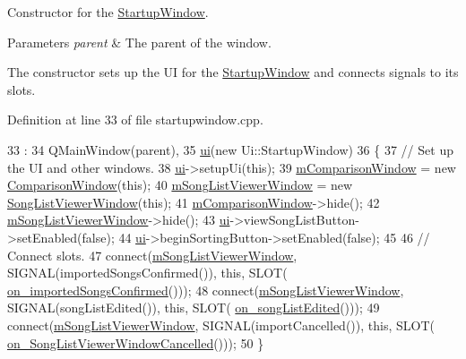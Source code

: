 Constructor for the \mbox{\hyperlink{class_startup_window}{Startup\+Window}}. 


\begin{DoxyParams}{Parameters}
{\em parent} & The parent of the window.\\
\hline
\end{DoxyParams}
The constructor sets up the UI for the \mbox{\hyperlink{class_startup_window}{Startup\+Window}} and connects signals to its slots. 

Definition at line 33 of file startupwindow.\+cpp.


\begin{DoxyCode}
33                                             :
34     QMainWindow(parent),
35     \mbox{\hyperlink{class_startup_window_a5afeeaabe9a34a02a67d2e7d9f36dc09}{ui}}(\textcolor{keyword}{new} Ui::StartupWindow)
36 \{
37     \textcolor{comment}{// Set up the UI and other windows.}
38     \mbox{\hyperlink{class_startup_window_a5afeeaabe9a34a02a67d2e7d9f36dc09}{ui}}->setupUi(\textcolor{keyword}{this});
39     \mbox{\hyperlink{class_startup_window_a674395b4edbe76568be4f0f4c7577ac1}{mComparisonWindow}} = \textcolor{keyword}{new} \mbox{\hyperlink{class_comparison_window}{ComparisonWindow}}(\textcolor{keyword}{this});
40     \mbox{\hyperlink{class_startup_window_a26e72433e3cf3d35ae49d77d91f5cc38}{mSongListViewerWindow}} = \textcolor{keyword}{new} \mbox{\hyperlink{class_song_list_viewer_window}{SongListViewerWindow}}(\textcolor{keyword}{this});
41     \mbox{\hyperlink{class_startup_window_a674395b4edbe76568be4f0f4c7577ac1}{mComparisonWindow}}->hide();
42     \mbox{\hyperlink{class_startup_window_a26e72433e3cf3d35ae49d77d91f5cc38}{mSongListViewerWindow}}->hide();
43     \mbox{\hyperlink{class_startup_window_a5afeeaabe9a34a02a67d2e7d9f36dc09}{ui}}->viewSongListButton->setEnabled(\textcolor{keyword}{false});
44     \mbox{\hyperlink{class_startup_window_a5afeeaabe9a34a02a67d2e7d9f36dc09}{ui}}->beginSortingButton->setEnabled(\textcolor{keyword}{false});
45 
46     \textcolor{comment}{// Connect slots.}
47     connect(\mbox{\hyperlink{class_startup_window_a26e72433e3cf3d35ae49d77d91f5cc38}{mSongListViewerWindow}}, SIGNAL(importedSongsConfirmed()), \textcolor{keyword}{this}, SLOT(
      \mbox{\hyperlink{class_startup_window_ac4235050012186e44fbc4e3e3c990d81}{on\_importedSongsConfirmed}}()));
48     connect(\mbox{\hyperlink{class_startup_window_a26e72433e3cf3d35ae49d77d91f5cc38}{mSongListViewerWindow}}, SIGNAL(songListEdited()), \textcolor{keyword}{this}, SLOT(
      \mbox{\hyperlink{class_startup_window_a18e7e279255ae11a1121f880d597dae9}{on\_songListEdited}}()));
49     connect(\mbox{\hyperlink{class_startup_window_a26e72433e3cf3d35ae49d77d91f5cc38}{mSongListViewerWindow}}, SIGNAL(importCancelled()), \textcolor{keyword}{this}, SLOT(
      \mbox{\hyperlink{class_startup_window_a049e5d9f548d809e89f546d29def2707}{on\_SongListViewerWindowCancelled}}()));
50 \}
\end{DoxyCode}
\mbox{\label{class_startup_window_a770398264202b2b44cf188c6a7b919fd}} 
